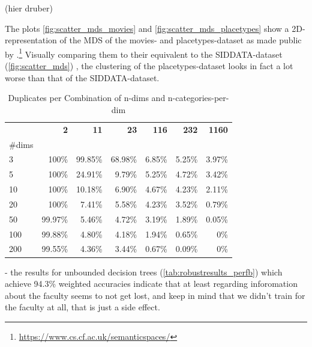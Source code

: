  (hier druber)



The plots \ref{fig:scatter_mds_movies} and \ref{fig:scatter_mds_placetypes} show a 2D-representation of the MDS %
of the movies- and placetypes-dataset as made public by \textcite{Derrac2015}.\footnote{\url{https://www.cs.cf.ac.uk/semanticspaces/}} Visually comparing them to their equivalent to the SIDDATA-dataset (\autoref{fig:scatter_mds}) , the clustering of the placetypes-dataset looks in fact a lot worse than that of the SIDDATA-dataset.







\begin{table}
	\caption{Duplicates per Combination of n-dims and n-categories-per-dim}
	\begin{tabular}{lrrrrrr}
	\toprule
	 & \textbf{2} & \textbf{11} & \textbf{23} & \textbf{116} & \textbf{232} & \textbf{1160} \\
	\#dims &  &  &  &  &  &  \\
	\midrule
	3 & 100\% & 99.85\% & 68.98\% & 6.85\% & 5.25\% & 3.97\% \\
	5 & 100\% & 24.91\% & 9.79\% & 5.25\% & 4.72\% & 3.42\% \\
	10 & 100\% & 10.18\% & 6.90\% & 4.67\% & 4.23\% & 2.11\% \\
	20 & 100\% & 7.41\% & 5.58\% & 4.23\% & 3.52\% & 0.79\% \\
	50 & 99.97\% & 5.46\% & 4.72\% & 3.19\% & 1.89\% & 0.05\% \\
	100 & 99.88\% & 4.80\% & 4.18\% & 1.94\% & 0.65\% & 0\% \\
	200 & 99.55\% & 4.36\% & 3.44\% & 0.67\% & 0.09\% & 0\% \\
	\bottomrule
	\end{tabular}
\end{table}

 - the results for unbounded decision trees (\autoref{tab:robustresults_perfb}) which achieve 94.3\% weighted accuracies indicate that at least regarding inforomation about the faculty seems to not get lost, and keep in mind that we didn't train for the faculty at all, that is just a side effect.


